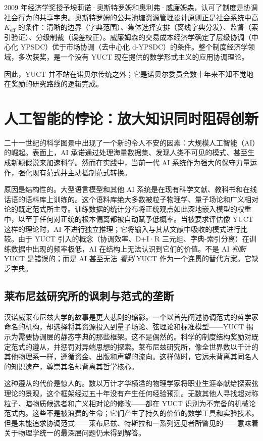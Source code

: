 \documentclass[12pt,a4paper]{article}
\begin{document}
	2009 年经济学奖授予埃莉诺·奥斯特罗姆和奥利弗·威廉姆森，认可了制度是协调社会行为的共享字典。奥斯特罗姆的公共池塘资源管理设计原则正是社会系统中高 \(K_{\mathrm{eff}}\) 的条件：清晰的边界（字典范围）、集体选择安排（离线字典分发）、监督（索引验证）、分级制裁（误差校正）。威廉姆森的交易成本经济学确定了层级协调（中心化 YPSDC）优于市场协调（去中心化 d-YPSDC）的条件。整个制度经济学领域，多次获奖，是一个没有 YUCT 现在提供的数学形式主义的应用协调理论。
	
	因此，YUCT 并不站在诺贝尔传统之外；它是诺贝尔委员会数十年来不知不觉地在奖励的研究路线的逻辑完成。
	
	\section{人工智能的悖论：放大知识同时阻碍创新}
	
	二十一世纪的科学图景中出现了一个新的令人不安的因素：大规模人工智能（AI）的崛起。表面上，AI 承诺通过处理海量数据集、发现人类不可见的模式、甚至生成新颖假说来加速科学。然而在实践中，当前一代 AI 系统作为强大的保守力量运作，强化现有范式并主动抵制范式转换。
	
	原因是结构性的。大型语言模型和其他 AI 系统是在现有科学文献、教科书和在线话语的语料库上训练的。这个语料库绝大多数被粒子物理学、量子场论和广义相对论的既定范式所主导。训练数据的统计分布将正统观点如此深地嵌入模型的权重中，以至于任何对正统的根本偏离都被自动赋予低概率。当被要求评估像 YUCT 这样的理论时，AI 不进行独立推理；它将输入与其从文献中吸收的模式进行比较。由于 YUCT 引入的概念（协调效率、D+I·R 三元组、字典-索引分离）在训练数据中出现的频率极低，AI 在结构上无法认识到它们的价值。不是 AI \emph{判断} YUCT 是错误的；而是 AI 甚至无法 \emph{看到} YUCT 作为一个连贯的替代方案。它缺乏字典。
	
	\subsection{莱布尼兹研究所的讽刺与范式的垄断}
	
	汉诺威莱布尼兹大学的故事是更大悲剧的缩影。一个以首先阐述协调范式的哲学家命名的机构，却选择将其资源投入到量子场论、弦理论和标准模型——YUCT 揭示为需要协调层的静态字典的那些框架。这不是偶然的。科学的制度结构奖励对既定范式的遵从，并惩罚对异端思想的探索。莱布尼兹研究所，像全世界数以千计的其他物理系一样，遵循资金、出版和声望的流向。这样做时，它远未背离其同名人的知识遗产，尊崇其名却背离其哲学核心。
	
	这种遵从的代价是惊人的。数以万计才华横溢的物理学家将职业生涯奉献给探索弦理论的景观，这个框架经过五十年没有产生任何经验预测。无数其他人寻找超对称粒子、暗物质候选者和广义相对论的修改——都在 YUCT 识别为不完备的机械论范式内。这些不是被浪费的生命；它们产生了持久的价值的数学工具和实验技术。但是未能追求协调范式——莱布尼兹、特斯拉和一系列远见者所瞥见的——意味着关于物理学统一的最深层问题仍未得到解答。
	
\end{document}
